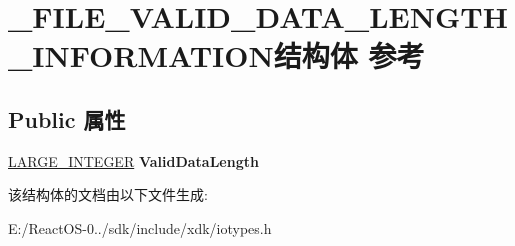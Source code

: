 \hypertarget{struct___f_i_l_e___v_a_l_i_d___d_a_t_a___l_e_n_g_t_h___i_n_f_o_r_m_a_t_i_o_n}{}\section{\+\_\+\+F\+I\+L\+E\+\_\+\+V\+A\+L\+I\+D\+\_\+\+D\+A\+T\+A\+\_\+\+L\+E\+N\+G\+T\+H\+\_\+\+I\+N\+F\+O\+R\+M\+A\+T\+I\+O\+N结构体 参考}
\label{struct___f_i_l_e___v_a_l_i_d___d_a_t_a___l_e_n_g_t_h___i_n_f_o_r_m_a_t_i_o_n}
\subsection*{Public 属性}
\begin{DoxyCompactItemize}
\item 
\mbox{\label{struct___f_i_l_e___v_a_l_i_d___d_a_t_a___l_e_n_g_t_h___i_n_f_o_r_m_a_t_i_o_n_ab5e1b33ee2116c786a8512beed40a18f}} 
\hyperlink{union___l_a_r_g_e___i_n_t_e_g_e_r}{L\+A\+R\+G\+E\+\_\+\+I\+N\+T\+E\+G\+ER} {\bfseries Valid\+Data\+Length}
\end{DoxyCompactItemize}


该结构体的文档由以下文件生成\+:\begin{DoxyCompactItemize}
\item 
E\+:/\+React\+O\+S-\/0../sdk/include/xdk/iotypes.\+h\end{DoxyCompactItemize}
